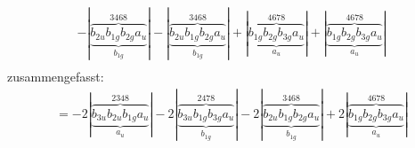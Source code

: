 \documentclass{article}
\begin{document}
\begin{multline*}
-\left|\underbrace{\overbrace{b_{2u} b_{1g} b_{2g} a_{u}}^{3 4 6 8}}_{b_{1g}}\right|-\left|\underbrace{\overbrace{b_{2u} b_{1g} b_{2g} a_{u}}^{3 4 6 8}}_{b_{1g}}\right|+\left|\underbrace{\overbrace{b_{1g} b_{2g} b_{3g} a_{u}}^{4 6 7 8}}_{a_{u}}\right|+\left|\underbrace{\overbrace{b_{1g} b_{2g} b_{3g} a_{u}}^{4 6 7 8}}_{a_{u}}\right|\\
\end{multline*}zusammengefasst:\begin{multline*}
=-2\left|\underbrace{\overbrace{b_{3u} b_{2u} b_{1g} a_{u}}^{2 3 4 8}}_{a_{u}}\right|-2\left|\underbrace{\overbrace{b_{3u} b_{1g} b_{3g} a_{u}}^{2 4 7 8}}_{b_{1g}}\right|-2\left|\underbrace{\overbrace{b_{2u} b_{1g} b_{2g} a_{u}}^{3 4 6 8}}_{b_{1g}}\right|+2\left|\underbrace{\overbrace{b_{1g} b_{2g} b_{3g} a_{u}}^{4 6 7 8}}_{a_{u}}\right|\\
\end{multline*}\\ \\
\vspace{0.5cm}
\end{document}

